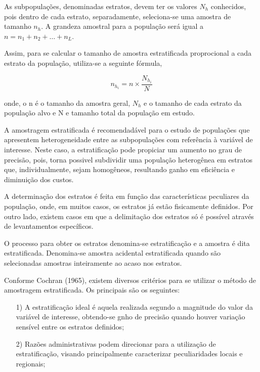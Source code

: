 As subpopulações, denominadas estratos, devem ter os valores
$N_{h}$ conhecidos, pois dentro de cada estrato, separadamente,
seleciona-se uma amostra de tamanho $n_{h}$. A grandeza amostral
para a população será igual a $n=n_{1}+n_{2}+\ldots+n_{L}$.
\vskip0.3cm

Assim, para se calcular o tamanho de amostra estratificada
proprocional a cada estrato da população, utiliza-se a seguinte
fórmula,

\begin{equation}\label{amostestra}
n_{h_{i}}= n \times \frac{N_{h_{i}}}{N}
\end{equation}

onde, o n é o tamanho da amostra geral, $N_{h}$ e o tamanho de
cada estrato da população alvo e N e tamanho total da população em
estudo. \vskip0.3cm


A amostragem estratificada é recomendadável para o estudo de
populações que apresentem heterogeneidade entre as subpopulações
com referência à variável de interesse. Neste caso, a
estratificação pode propiciar um aumento no grau de precisão,
pois, torna possivel subdividir uma população heterogênea em
estratos que, individualmente, sejam homogêneos, resultando ganho
em eficiência e diminuição dos custos.\vskip0.3cm


A determinação dos estratos é feita em função das características
peculiares da população, onde, em muitos casos, os estratos já
estão fisicamente definidos. Por outro lado, existem casos em que
a delimitação dos estratos só é possível através de levantamentos
específicos.\vskip0.3cm


O processo para obter os estratos denomina-se estratificação e a
amostra é dita estratificada. Denomina-se amostra acidental
estratificada quando são selecionadas amostras inteiramente ao
acaso nos estratos.\vskip0.3cm

Conforme Cochran (1965), existem diversos critérios para se
utilizar o método de amostragem estratificada. Os principais são
os seguintes:


\begin{enumerate}
  \item[{1)}] A estratificação ideal é aquela realizada segundo a magnitude do valor da variável de interesse,
  obtendo-se gnho de precisão quando houver variação sensível entre os estratos definidos;
  \item[{2)}] Razões administrativas podem direcionar para a utilização de estratificação, visando
  principalmente caracterizar peculiaridades locais e regionais;
\end{enumerate}

